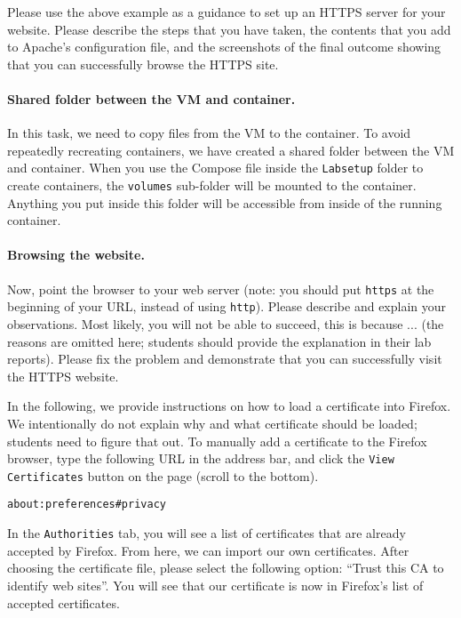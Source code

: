 Please use the above example as a guidance to set up an HTTPS server for 
your website. Please describe the steps that 
you have taken, the contents that you add to Apache's configuration file, and 
the screenshots of the final outcome showing that you can successfully browse
the HTTPS site. 


\paragraph{Shared folder between the VM and container.} 
In this task, we need to copy files from the VM to the container. 
To avoid repeatedly recreating containers, we have created a shared
folder between the VM and container. When you use the Compose file
inside the \texttt{Labsetup} folder to create containers, 
the \texttt{volumes} sub-folder
will be mounted to the container. Anything you put inside 
this folder will be accessible from inside of the running container.  


\paragraph{Browsing the website.} 
Now, point the browser to your web server (note: you should 
put \texttt{https} at the beginning of your URL, instead of using \texttt{http}).  
Please describe and explain your observations. 
Most likely, you will not be able to succeed,  this is
because ... (the reasons are omitted here; students should 
provide the explanation in their lab reports). Please fix the problem
and demonstrate that you can successfully visit the HTTPS website. 


In the following, we provide instructions on how to load 
a certificate into Firefox. We intentionally do not explain why and what 
certificate should be loaded; students need to figure that out.
To manually add a certificate to the Firefox browser,  type the following
URL in the address bar, and click the \texttt{View Certificates} button 
on the page (scroll to the bottom).

\begin{lstlisting}
about:preferences#privacy
\end{lstlisting}

In the \texttt{Authorities} tab,  you will see a list of certificates 
that are already accepted by Firefox. From here, we 
can import our own certificates. After choosing the certificate 
file, please select the following option: ``Trust this CA to identify web sites''.  
You will see that our certificate is now in Firefox's list of 
accepted certificates. 



